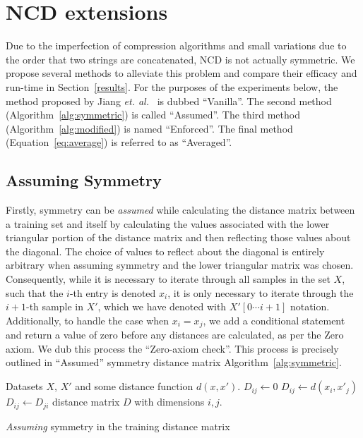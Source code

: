 \documentclass[preprint,12pt]{elsarticle}
\begin{document}
\section{NCD extensions}
\label{extensions}

Due to the imperfection of compression algorithms and small variations due to the order that two strings are concatenated, NCD is not actually symmetric.
We propose several methods to alleviate this problem and compare their efficacy and run-time in Section~\ref{results}. 
For the purposes of the experiments below, the method proposed by Jiang \textit{et. al.}~\cite{jiang2022less} is dubbed ``Vanilla''.
The second method (Algorithm~\ref{alg:symmetric}) is called ``Assumed''.
The third method (Algorithm~\ref{alg:modified}) is named ``Enforced''.
The final method (Equation~\ref{eq:average}) is referred to as ``Averaged''.

\subsection{Assuming Symmetry}
Firstly, symmetry can be \textit{assumed} while calculating the distance matrix between a training set and itself by calculating the values associated with the lower triangular portion of the distance matrix and then reflecting those values about the diagonal. 
The choice of values to reflect about the diagonal is entirely arbitrary when assuming symmetry and the lower triangular matrix was chosen. 
Consequently, while it is necessary to iterate through all samples in the set $X$, such that the $i$-th entry is denoted $x_i$, it is only necessary to iterate through the $i +1$-th sample in $X'$, which we have denoted with $X'[0 \cdots i + 1 ]$ notation. 
Additionally, to handle the case when $x_i = x_j$, we add a conditional statement and return a value of zero before any distances are calculated, as per the Zero axiom. 
We dub this process the ``Zero-axiom check''. 
This process is precisely outlined in ``Assumed'' symmetry distance matrix Algorithm~\ref{alg:symmetric}. 

\begin{algorithm}
    \begin{algorithmic}
        \Require Datasets $X$, $X'$ and some distance function $d(x, x')$.
             
                 
                    \State $D_{ij} \gets 0$
                \Else
                    \State $D_{ij} \gets d(x_{i},x'_{j})$
                \EndIf
                \State $D_{ij} \gets D_{ji}$ 
            \EndFor
        \EndFor
        \State \Return distance matrix $D$ with dimensions $i,j$.
    \end{algorithmic}
    \caption{\textit{Assuming} symmetry in the training distance matrix}
    \label{alg:symmetric}
\end{algorithm}
\end{document}
